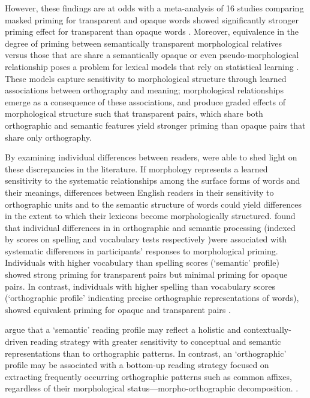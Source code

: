 \documentclass[review]{elsarticle}
\begin{document}
However, these findings are at odds with a  meta-analysis of 16 studies comparing masked priming for transparent and opaque words showed significantly stronger priming effect for transparent than opaque words \citep{feldmanEarlyMorphologicalProcessing2009}. Moreover, equivalence in the degree of priming between semantically transparent morphological relatives versus those that are share a semantically opaque or even pseudo-morphological relationship poses a problem for lexical models that rely on statistical learning \citep{plautAreNonsemanticMorphological2000, baayenAmorphousModelMorphological2011}. These models capture sensitivity to morphological structure through learned associations between orthography and meaning; morphological relationships emerge as a consequence of these associations, and  produce graded effects of morphological structure such that transparent pairs, which share both orthographic and semantic features yield stronger priming than opaque pairs that share only orthography.    

By examining individual differences between readers, {\renewcommand\&{and}\citet{andrewsMorphologicalPrimingStronger2013}}  were able to shed light on these discrepancies in the literature.  If morphology represents a learned sensitivity to the systematic relationships among the surface forms of words and their meanings, differences between English readers in their sensitivity to orthographic units and to the semantic structure of words could  yield differences in the extent to which their lexicons become morphologically structured.  {\renewcommand\&{and}\citet{andrewsMorphologicalPrimingStronger2013}} found that individual differences in in orthographic and semantic processing (indexed by scores on spelling and vocabulary tests respectively )were associated with systematic differences in participants' responses to morphological priming.  Individuals with higher vocabulary than spelling scores (`semantic' profile) showed strong priming for transparent pairs but minimal priming for opaque pairs. In contrast, individuals with higher spelling than vocabulary scores (‘orthographic profile’ indicating precise orthographic representations of words), showed equivalent priming for opaque and transparent pairs \citep{andrewsMorphologicalPrimingStronger2013}.

{\renewcommand\&{and}\citet{andrewsMorphologicalPrimingStronger2013}} argue that a `semantic' reading profile may reflect a holistic and contextually-driven reading strategy with greater sensitivity to conceptual and semantic representations than to orthographic patterns.  In contrast, an `orthographic' profile may be associated with a bottom-up reading strategy focused on extracting  frequently occurring orthographic patterns such as common affixes, regardless of their morphological status—morpho-orthographic decomposition.  . 
 
\end{document}
